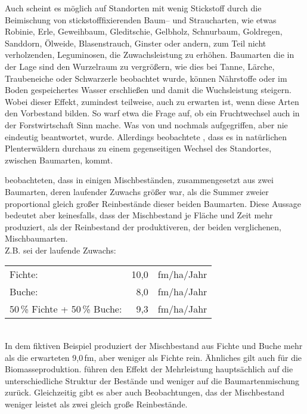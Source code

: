 \documentclass[twocolumn]{scrartcl}
\begin{document}
Auch scheint es möglich auf Standorten mit wenig Stickstoff durch die
Beimischung von stickstofffixierenden Baum-- und Straucharten, wie
etwas Robinie, Erle, Geweihbaum, Gleditschie, Gelbholz, Schnurbaum,
Goldregen, Sanddorn, Ölweide, Blasenstrauch, Ginster oder andern, zum
Teil nicht verholzenden, Leguminosen, die Zuwachsleistung zu
erhöhen. Baumarten die in der Lage sind den Wurzelraum zu vergrößern,
wie dies bei Tanne, Lärche, Traubeneiche oder Schwarzerle
\cite[S.~114, 130, 150, 180]{koestler1969WurzelnDerWaldbaeume}
beobachtet wurde, können Nährstoffe oder im Boden gespeichertes Wasser
erschließen und damit die Wuchsleistung steigern. Wobei dieser Effekt, zumindest
teilweise, auch zu erwarten ist, wenn diese Arten den Vorbestand bilden. So warf
etwa \cite{jentsch1911fruchtwechsel} die Frage auf, ob ein Fruchtwechsel auch in
der Forstwirtschaft Sinn mache. Was von \cite{sieber1919Holzartenwechsel} und
\cite{fabricius1924Holzartenwechsel} nochmals aufgegriffen, aber nie eindeutig
beantwortet, wurde. Allerdings beobachtete \cite{simak1951Baumartenwechsel},
dass es in natürlichen Plenterwäldern durchaus zu einem gegenseitigen Wechsel
des Standortes, zwischen Baumarten, kommt.

\cite{pretzsch2017mischwald} beobachteten, dass in einigen
Mischbeständen, zusammengesetzt aus zwei Baumarten, deren laufender Zuwachs größer war, als die Summer zweier proportional gleich großer Reinbestände dieser beiden Baumarten. Diese Aussage bedeutet aber
keinesfalls, dass der Mischbestand je Fläche und Zeit mehr produziert,
als der Reinbestand der produktiveren, der beiden verglichenen,
Mischbaumarten.\\
Z.B. sei der laufende Zuwachs:\\
\begin{tabular}{lr@{\,}l}
    Fichte:                      & 10,0 & fm/ha/Jahr\\
    Buche:                       &  8,0 & fm/ha/Jahr\\
    50\,\% Fichte + 50\,\% Buche: &  9,3 & fm/ha/Jahr\\
\end{tabular}\\
In dem fiktiven Beispiel produziert der Mischbestand aus Fichte und
Buche mehr als die erwarteten 9,0\,fm, aber weniger als Fichte
rein. Ähnliches gilt auch für die Biomasseproduktion.
\cite{sterba2018struktur} führen den Effekt der Mehrleistung
hauptsächlich auf die unterschiedliche Struktur der Bestände und
weniger auf die Baumartenmischung zurück. Gleichzeitig gibt es aber
auch Beobachtungen, das der Mischbestand weniger leistet als zwei
gleich große Reinbestände.
\end{document}
